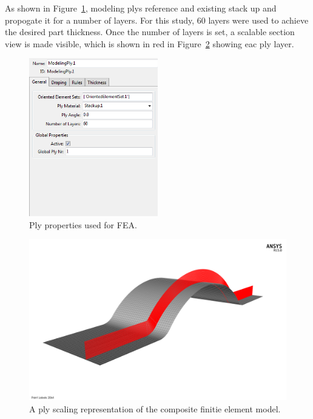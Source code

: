 As shown in Figure~\ref{fig:fea-acp-modeling-ply-properties}, modeling plys reference and existing stack up and propogate it for a number of layers. For this study, 60 layers were used to achieve the desired part thickness. Once the number of layers is set, a scalable section view is made visible, which is shown in red in Figure~\ref{fig:fea-acp-ply-scaling} showing eac ply layer.\\

\begin{figure}[htp]
\centering
\includegraphics[width=0.5\textwidth]{./figures/fea/fea-acp-modeling-ply-properties}
\caption{Ply properties used for FEA.}
\label{fig:fea-acp-modeling-ply-properties}
\end{figure}

\begin{figure}[htp]
\centering
\includegraphics[width=1\textwidth]{./figures/fea/fea-acp-ply-scaling}
\caption{A ply scaling representation of the composite finitie element model.}
\label{fig:fea-acp-ply-scaling}
\end{figure}

